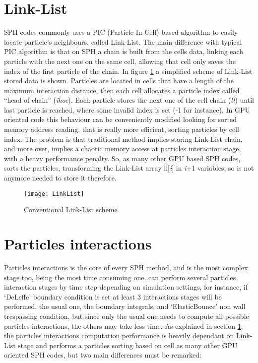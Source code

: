 \section{Link-List}
\label{ss:aquagpusph:linklist}
%
SPH codes commonly uses a PIC (Particle In Cell) based algorithm to easily locate particle's neighbours, called
Link-List. The main difference with typical PIC algorithm is that on SPH a chain is built from the cells data,
linking each particle with the next one on the same cell, allowing that cell only saves the index of the
first particle of the chain.\rc
%
In figure \ref{fig:aquagpusph:LinkList} a simplified scheme of Link-List stored data is shown. Particles are
located in cells that have a length of the maximum interaction distance, then each cell allocates a particle
index called ``head of chain'' (\textit{ihoc}). Each particle stores the next one of the cell chain (\textit{ll})
until last particle is reached, where some invalid index is set  (-1 for instance).\rc
%
In GPU oriented code this behaviour can be conveniently modified looking for sorted memory address reading, that
is really more efficient, sorting particles by cell index. The problem is that traditional method implies storing
Link-List chain, and more over, implies a chaotic memory access at particles interaction stage, with a heavy
performance penalty. So, as many other GPU based SPH codes, \NAME sorts the particles, transforming the Link-List
array ll[\textit{i}] in \textit{i}+1 variables, so is not anymore needed to store it therefore.\rc
%
\begin{figure}[h!]
  \centering
  \texttt{[image: LinkList]}
  \caption{Conventional Link-List scheme}
  \label{fig:aquagpusph:LinkList}
\end{figure}
%
\section{Particles interactions}
\label{ss:aquagpusph:rates}
%
Particles interactions is the core of every SPH method, and is the most complex stage too, being the most
time consuming one. \NAME can perform several particles interaction stages by time step depending on simulation
settings, for instance, if `DeLeffe' boundary condition is set at least 3 interactions stages will be performed,
the usual one, the boundary integrals, and `ElasticBounce' non wall trespassing condition, but since only the usual one
needs to compute all possible particles interactions, the others may take less time.\rc
%
As explained in section \ref{ss:aquagpusph:linklist}, the particles interactions computation performance is
heavily dependant on Link-List stage and \NAME performs a particles sorting based on cell as many other GPU
oriented SPH codes, but two main differences must be remarked:
%
